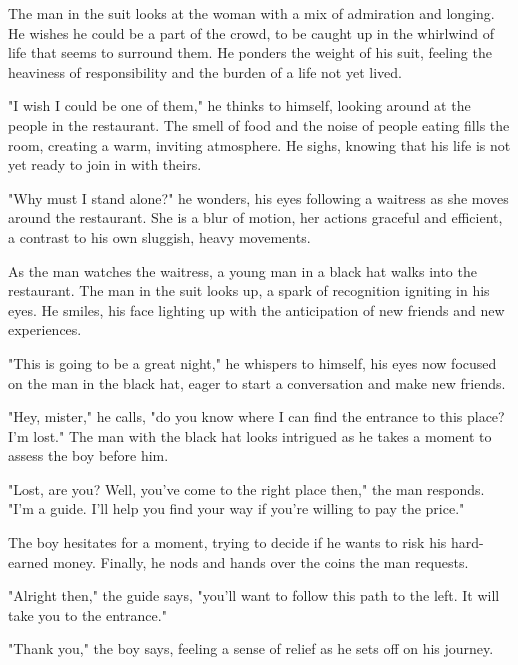 \documentclass[smalldemyvopaper,11pt,twoside,onecolumn,openright,extrafontsizes]{memoir}
\begin{document}
The man in the suit looks at the woman with a mix of admiration and longing. He wishes he could be a part of the crowd, to be caught up in the whirlwind of life that seems to surround them. He ponders the weight of his suit, feeling the heaviness of responsibility and the burden of a life not yet lived.\par
"I wish I could be one of them," he thinks to himself, looking around at the people in the restaurant. The smell of food and the noise of people eating fills the room, creating a warm, inviting atmosphere. He sighs, knowing that his life is not yet ready to join in with theirs.\par
"Why must I stand alone?" he wonders, his eyes following a waitress as she moves around the restaurant. She is a blur of motion, her actions graceful and efficient, a contrast to his own sluggish, heavy movements.\par
As the man watches the waitress, a young man in a black hat walks into the restaurant. The man in the suit looks up, a spark of recognition igniting in his eyes. He smiles, his face lighting up with the anticipation of new friends and new experiences.\par
"This is going to be a great night," he whispers to himself, his eyes now focused on the man in the black hat, eager to start a conversation and make new friends.\par
"Hey, mister," he calls, "do you know where I can find the entrance to this place? I'm lost." The man with the black hat looks intrigued as he takes a moment to assess the boy before him.\par
"Lost, are you? Well, you've come to the right place then," the man responds. "I'm a guide. I'll help you find your way if you're willing to pay the price."\par
The boy hesitates for a moment, trying to decide if he wants to risk his hard-earned money. Finally, he nods and hands over the coins the man requests.\par
"Alright then," the guide says, "you'll want to follow this path to the left. It will take you to the entrance."\par
"Thank you," the boy says, feeling a sense of relief as he sets off on his journey.\par
\end{document}
